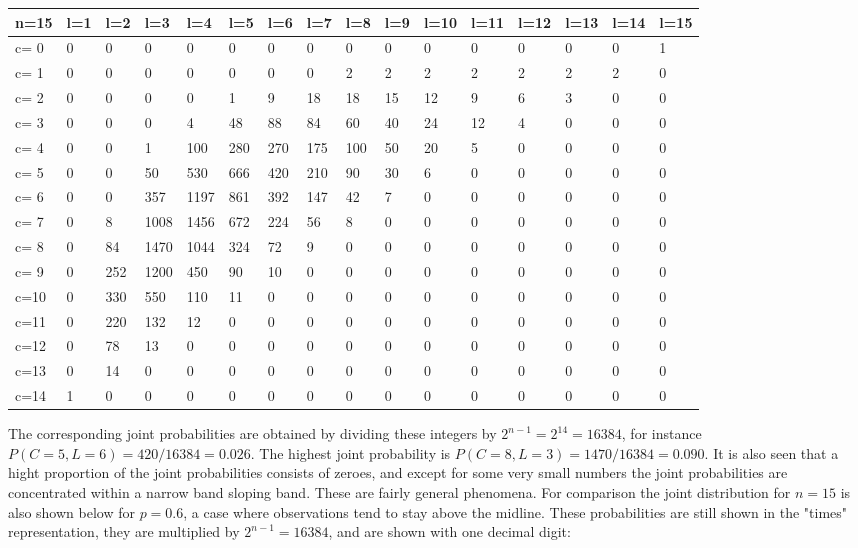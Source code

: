 \tiny{
\begin{tabular}{l | l l l l l l l l l l l l l l l}
\hline
n=15&l=1&l=2&l=3&l=4&l=5&l=6&l=7&l=8&l=9&l=10&l=11&l=12&l=13&l=14&l=15\\
\hline
c= 0& 0& 0& 0& 0& 0& 0& 0& 0& 0& 0& 0& 0& 0& 0& 1\\
c= 1& 0& 0& 0& 0& 0& 0& 0& 2& 2& 2& 2& 2& 2& 2& 0\\
c= 2& 0& 0& 0& 0& 1& 9& 18& 18& 15& 12& 9& 6& 3& 0& 0\\
c= 3& 0& 0& 0& 4& 48& 88& 84& 60& 40& 24& 12& 4& 0& 0& 0\\
c= 4& 0& 0& 1& 100& 280& 270& 175& 100& 50& 20& 5& 0& 0& 0& 0\\
c= 5& 0& 0& 50& 530& 666& 420& 210& 90& 30& 6& 0& 0& 0& 0& 0\\
c= 6& 0& 0& 357& 1197& 861& 392& 147& 42& 7& 0& 0& 0& 0& 0& 0\\
c= 7& 0& 8& 1008& 1456& 672& 224& 56& 8& 0& 0& 0& 0& 0& 0& 0\\
c= 8& 0& 84& 1470& 1044& 324& 72& 9& 0& 0& 0& 0& 0& 0& 0& 0\\
c= 9& 0& 252& 1200& 450& 90& 10& 0& 0& 0& 0& 0& 0& 0& 0& 0\\
c=10& 0& 330& 550& 110& 11& 0& 0& 0& 0& 0& 0& 0& 0& 0& 0\\
c=11& 0& 220& 132& 12& 0& 0& 0& 0& 0& 0& 0& 0& 0& 0& 0\\
c=12& 0& 78& 13& 0& 0& 0& 0& 0& 0& 0& 0& 0& 0& 0& 0\\
c=13& 0& 14& 0& 0& 0& 0& 0& 0& 0& 0& 0& 0& 0& 0& 0\\
c=14& 1& 0& 0& 0& 0& 0& 0& 0& 0& 0& 0& 0& 0& 0& 0\\
\hline
\end{tabular}
}

\normalsize

The corresponding joint probabilities are obtained by dividing these integers by $2^{n-1}=2^{14}=16384$, for instance $P(C=5, L=6)=420/16384=0.026$. The highest joint probability is $P(C=8, L=3)=1470/16384=0.090$. It is also seen that a hight proportion of the joint probabilities consists of zeroes, and except for some very small numbers the joint probabilities are concentrated within a narrow band sloping band. These are fairly general phenomena. For comparison the joint distribution for $n = 15$ is also shown below for $p = 0.6$, a case where observations tend to stay above the midline. These probabilities are still shown in the "times" representation, they are multiplied by $2^{n-1}=16384$, and are shown with one decimal digit:

